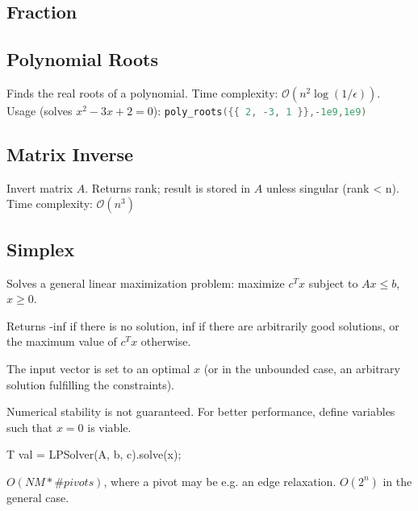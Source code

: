 \documentclass{article}
\begin{document}
\subsection*{Fraction}


\begin{multicols}{2}
\subsection*{Polynomial Roots}
Finds the real roots of a polynomial. Time complexity: $\mathcal{O}(n^2 \log(1/\epsilon))$.
Usage (solves $x^2-3x+2 = 0$): \lstinline[language=cpp]|poly_roots({{ 2, -3, 1 }},-1e9,1e9)|

\columnbreak
\subsection*{Matrix Inverse}
Invert matrix $A$. Returns rank; result is stored in $A$ unless singular (rank < n). Time complexity: $\mathcal{O}(n^3)$

\end{multicols}

\newpage

\subsection*{Simplex}
Solves a general linear maximization problem: maximize $c^T x$ subject to $Ax \le b$, $x \ge 0$.

Returns -inf if there is no solution, inf if there are arbitrarily good solutions, or the maximum value of $c^T x$ otherwise.

The input vector is set to an optimal $x$ (or in the unbounded case, an arbitrary solution fulfilling the constraints).

Numerical stability is not guaranteed. For better performance, define variables such that $x = 0$ is viable.

 T val = LPSolver(A, b, c).solve(x);
 
 $O(NM * \#pivots)$, where a pivot may be e.g. an edge relaxation. $O(2^n)$ in the general case.





\vspace*{1cm}
\end{document}
